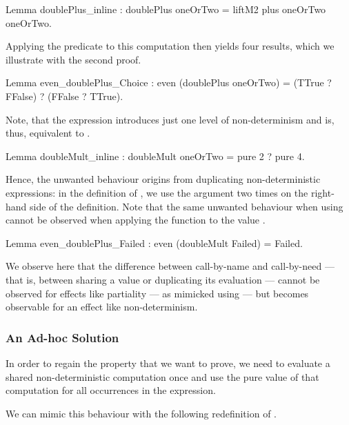 \begin{coqcode}
Lemma doublePlus_inline :
  doublePlus oneOrTwo = liftM2 plus oneOrTwo oneOrTwo.
\end{coqcode}

\noindent Applying the predicate  to this computation then yields four results, which we illustrate with the second proof.

\begin{coqcode}
Lemma even_doublePlus_Choice :
  even (doublePlus oneOrTwo) = (TTrue ? FFalse) ? (FFalse ? TTrue).
\end{coqcode}

Note, that the expression  introduces just one level of non\--determinism and is, thus, equivalent to .

\begin{coqcode}
Lemma doubleMult_inline :
  doubleMult oneOrTwo = pure 2 ? pure 4.
\end{coqcode}

Hence, the unwanted behaviour origins from duplicating non\--deterministic expressions: in the definition of , we use the argument  two times on the right\--hand side of the definition.
Note that the same unwanted behaviour when using  cannot be observed when applying the function to the value .

\begin{coqcode}
Lemma even_doublePlus_Failed :
  even (doubleMult Failed) = Failed.
\end{coqcode}

We observe here that the difference between call\--by\--name and call\--by\--need --- that is, between sharing a value or duplicating its evaluation --- cannot be observed for effects like partiality --- as mimicked using  --- but becomes observable for an effect like non\--determinism.

\subsubsection{An Ad\--hoc Solution}
\label{subsubsec:adhoc}

In order to regain the property that we want to prove, we need to evaluate a shared non\--deterministic computation once and use the pure value of that computation for all occurrences in the expression.

We can mimic this behaviour with the following redefinition of .

